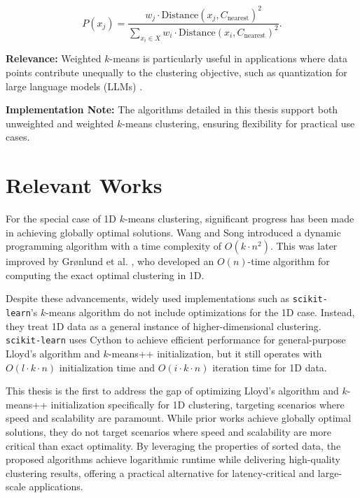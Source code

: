 \[
P(x_j) = \frac{w_j \cdot \text{Distance}(x_j, C_{\text{nearest}})^2}{\sum_{x_i \in X} w_i \cdot \text{Distance}(x_i, C_{\text{nearest}})^2}.
\]


\noindent \textbf{Relevance:}  
Weighted $k$-means is particularly useful in applications where data points contribute unequally to the clustering objective, such as quantization for large language models (LLMs) \cite{sqllm, anyprec}.

\noindent \textbf{Implementation Note:}  
The algorithms detailed in this thesis support both unweighted and weighted $k$-means clustering, ensuring flexibility for practical use cases.

\section{Relevant Works}\label{sec:relevantworks}

For the special case of 1D $k$-means clustering, significant progress has been made in achieving globally optimal solutions. Wang and Song \cite{wang1ddp} introduced a dynamic programming algorithm with a time complexity of \(O(k \cdot n^2)\). This was later improved by Grønlund et al. \cite{fastexactkmeans}, who developed an \(O(n)\)-time algorithm for computing the exact optimal clustering in 1D.

Despite these advancements, widely used implementations such as \texttt{scikit-learn}'s $k$-means algorithm \cite{sklearn} do not include optimizations for the 1D case. Instead, they treat 1D data as a general instance of higher-dimensional clustering. \texttt{scikit-learn} uses Cython \cite{cython} to achieve efficient performance for general-purpose Lloyd's algorithm and $k$-means++ initialization, but it still operates with \(O(l \cdot k \cdot n)\) initialization time and \(O(i \cdot k \cdot n)\) iteration time for 1D data.

This thesis is the first to address the gap of optimizing Lloyd’s algorithm and $k$-means++ initialization specifically for 1D clustering, targeting scenarios where speed and scalability are paramount. While prior works achieve globally optimal solutions, they do not target scenarios where speed and scalability are more critical than exact optimality. By leveraging the properties of sorted data, the proposed algorithms achieve logarithmic runtime while delivering high-quality clustering results, offering a practical alternative for latency-critical and large-scale applications.